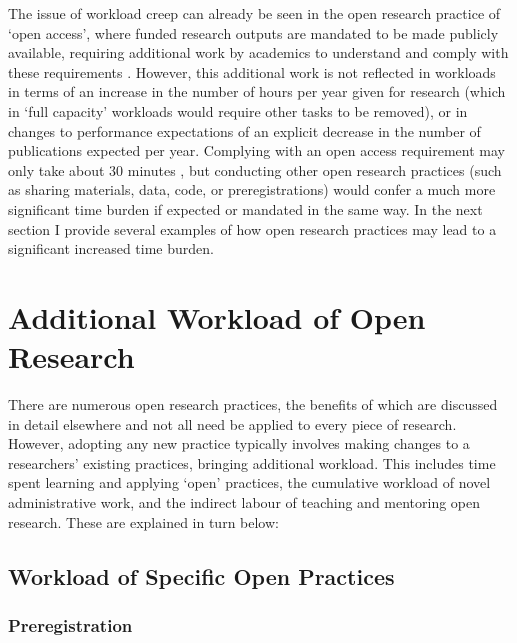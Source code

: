 \documentclass[meta, authordate]{jote-new-article}
\begin{document}
The issue of workload creep can already be seen in the open research practice of ‘open access’, where funded research outputs are mandated to be made publicly available, requiring additional work by academics to understand and comply with these requirements \parencites{Research Consulting2014}. However, this additional work is not reflected in workloads in terms of an increase in the number of hours per year given for research (which in ‘full capacity’ workloads would require other tasks to be removed), or in changes to performance expectations of an explicit decrease in the number of publications expected per year. Complying with an open access requirement may only take about 30 minutes \parencites{Reimer2014}, but conducting other open research practices (such as sharing materials, data, code, or preregistrations) would confer a much more significant time burden if expected or mandated in the same way. In the next section I provide several examples of how open research practices may lead to a significant increased time burden.











\section{Additional Workload of Open Research}



There are numerous open research practices, the benefits of which are discussed in detail elsewhere \parencites[e.g.][]{Munafò2017}{Nosek2018} and not all need be applied to every piece of research. However, adopting any new practice typically involves making changes to a researchers’ existing practices, bringing additional workload. This includes time spent learning and applying ‘open’ practices, the cumulative workload of novel administrative work, and the indirect labour of teaching and mentoring open research. These are explained in turn below:



\subsection{Workload of Specific Open Practices}



\subsubsection{Preregistration}
\end{document}
